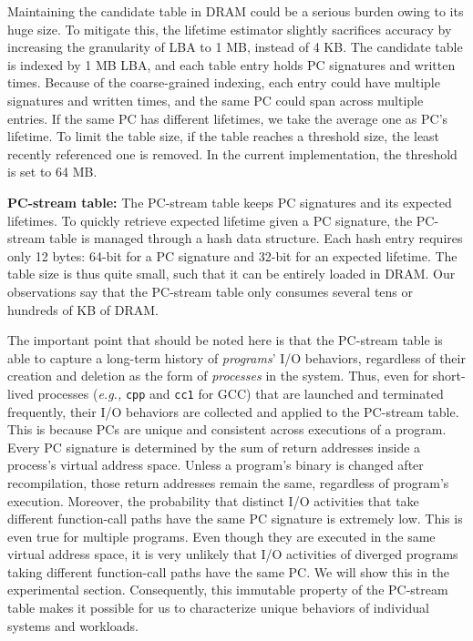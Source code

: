 Maintaining the candidate table in DRAM could be a serious burden owing to its
huge size. To mitigate this, the lifetime estimator slightly sacrifices
accuracy by increasing the granularity of LBA to 1 MB, instead of 4 KB.  The
candidate table is indexed by 1 MB LBA, and each table entry holds PC
signatures and written times. Because of the coarse-grained indexing, each entry
could have multiple signatures and written times, and the same PC could span
across multiple entries.  If the same PC has different lifetimes, we take the
average one as PC's lifetime. 
To limit the table size, if the table reaches a
threshold size, the least recently referenced one is removed. In the current
implementation, the threshold is set to 64 MB.

\textbf{PC-stream table:}
The PC-stream table keeps PC signatures and its expected lifetimes. To quickly
retrieve expected lifetime given a PC signature, the PC-stream table is managed
through a hash data structure. Each hash entry requires only 12 bytes: 64-bit
for a PC signature and 32-bit for an expected lifetime.  The table size is thus
quite small, such that it can be entirely loaded in DRAM. Our observations say
that the PC-stream table only consumes several tens or hundreds of KB of DRAM.

The important point that should be noted here is that the PC-stream table is
able to capture a long-term history of \textit{programs}' I/O behaviors,
regardless of their creation and deletion as the form of \textit{processes} in
the system. Thus, even for short-lived processes (\textit{e.g.,} \texttt{cpp}
and \texttt{cc1} for GCC) that are launched and terminated frequently, their
I/O behaviors are collected and applied to the PC-stream table.  This is
because PCs are unique and consistent across executions of a program.  Every PC
signature is determined by the sum of return addresses inside a process's
virtual address space.  Unless a program's binary is changed after
recompilation, those return addresses remain the same, regardless of program's
execution.  Moreover, the probability that distinct I/O activities that take
different function-call paths have the same PC signature is extremely low. This
is even true for multiple programs. Even though they are executed in the same
virtual address space, it is very unlikely that I/O activities of diverged
programs taking different function-call paths have the same PC.  We will show
this in the experimental section. Consequently, this immutable property of
the PC-stream table makes it possible for us to characterize 
unique behaviors of individual systems and workloads.

